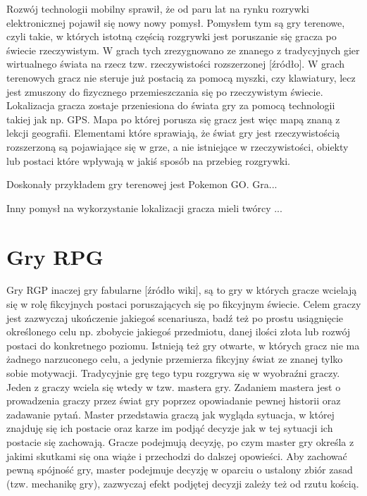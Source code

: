 \documentclass	{xmgr}
\begin{document}
Rozwój technologii mobilny sprawił, że od paru lat na rynku rozrywki elektronicznej pojawił się nowy nowy pomysł. Pomysłem tym są gry terenowe, czyli takie, w których istotną częścią rozgrywki jest poruszanie się gracza po świecie rzeczywistym. W grach tych zrezygnowano ze znanego z tradycyjnych gier wirtualnego świata na rzecz tzw. rzeczywistości rozszerzonej [źródło]. W grach terenowych gracz nie steruje już postacią za pomocą myszki, czy klawiatury, lecz jest zmuszony do fizycznego przemieszczania się po rzeczywistym świecie. Lokalizacja gracza zostaje przeniesiona do świata gry za pomocą technologii takiej jak np. GPS. Mapa po której porusza się gracz jest więc mapą znaną z lekcji geografii. Elementami które sprawiają, że świat gry jest rzeczywistością rozszerzoną są pojawiające się w grze, a nie istniejące w rzeczywistości, obiekty lub postaci które wpływają w jakiś sposób na przebieg rozgrywki.

Doskonały przykładem gry terenowej jest Pokemon GO. Gra...

Inny pomysł na wykorzystanie lokalizacji gracza mieli twórcy ...

\section{Gry RPG}

Gry RGP inaczej gry fabularne [źródło wiki], są to gry w których gracze wcielają się w rolę fikcyjnych postaci poruszających się po fikcyjnym świecie.  Celem graczy jest zazwyczaj ukończenie jakiegoś scenariusza, badź też po prostu usiągnięcie określonego celu np. zbobycie jakiegoś przedmiotu, danej ilości złota lub rozwój postaci do konkretnego poziomu. Istnieją też gry otwarte, w których gracz nie ma żadnego narzuconego celu, a jedynie przemierza fikcyjny świat ze znanej tylko sobie motywacji. Tradycyjnie grę tego typu rozgrywa się w wyobraźni graczy. Jeden z graczy wciela się wtedy w tzw. mastera gry. Zadaniem mastera jest o prowadzenia graczy przez świat gry poprzez opowiadanie pewnej historii oraz zadawanie pytań. Master przedstawia graczą jak wygląda sytuacja, w której znajduję się ich postacie oraz karze im podjąć decyzje jak w tej sytuacji ich postacie się zachowają. Gracze podejmują decyzję, po czym master gry określa z jakimi skutkami się ona wiąże i przechodzi do dalszej opowieści. Aby zachować pewną spójność gry, master podejmuje decyzję w oparciu o ustalony zbiór zasad (tzw. mechanikę gry), zazwyczaj efekt podjętej decyzji zależy też od rzutu kością.
\end{document}
